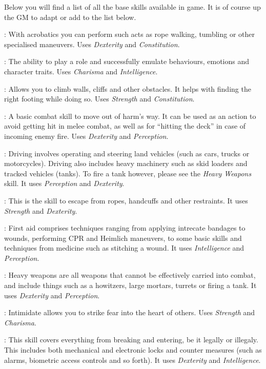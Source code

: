 Below you will find a list of all the base skills available in game. It is of
course up the GM to adapt or add to the list below.

: With acrobatics you can perform such acts as rope walking,
tumbling or other specialised maneuvers. Uses \emph{Dexterity} and
\emph{Constitution}.

: The ability to play a role and successfully emulate behaviours,
emotions and character traits. Uses \emph{Charisma} and \emph{Intelligence}.

: Allows you to climb walls, cliffs and other obstacles. It helps
with finding the right footing while doing so. Uses \emph{Strength} and
\emph{Constitution}.

: A basic combat skill to move out of harm's way. It can be used
as an action to avoid getting hit in melee combat, as well as for ``hitting the
deck'' in case of incoming enemy fire. Uses \emph{Dexterity} and
\emph{Perception}.

: Driving involves operating and steering land vehicles (such as
cars, trucks or motorcycles). Driving also includes heavy machinery such as
skid loaders and tracked vehicles (tanks). To fire a tank however, please see
the \emph{Heavy Weapons} skill. It uses \emph{Perception} and \emph{Dexterity}.

: This is the skill to escape from ropes, handcuffs and
other restraints. It uses \emph{Strength} and \emph{Dexterity}.

: First aid comprises techniques ranging from applying intrecate
bandages to wounds, performing CPR and Heimlich maneuvers, to some basic skills
and techniques from medicine such as stitching a wound. It uses
\emph{Intelligence} and \emph{Perception}.

: Heavy weapons are all weapons that cannot be effectively
carried into combat, and include things such as a howitzers, large mortars,
turrets or firing a tank. It uses \emph{Dexterity} and \emph{Perception}.

: Intimidate allows you to strike fear into the heart of
others. Uses \emph{Strength} and \emph{Charisma}.

: This skill covers everything from breaking and entering, be
it legally or illegaly. This includes both mechanical and electronic locks and
counter measures (such as alarms, biometric access controls and so forth). It
uses \emph{Dexterity} and \emph{Intelligence}.

